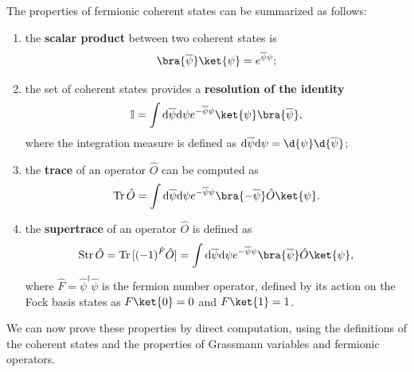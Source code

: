 The properties of fermionic coherent states can be summarized as follows:
\begin{enumerate}
    \item the \textbf{scalar product} between two coherent states is
          \[
              \bra{\overline{\psi}} \ket{\psi} = e^{\overline{\psi} \psi};
          \]
    \item the set of coherent states provides a \textbf{resolution of the identity}
          \[
              \mathbb{I} = \int \mathrm{d} \overline{\psi} \mathrm{d} \psi e^{-\overline{\psi} \psi} \ket{\psi} \bra{\overline{\psi}},
          \]
          where the integration measure is defined as \(\mathrm{d} \overline{\psi} \mathrm{d} \psi = \d{\psi} \d{\overline{\psi}}\);
    \item the \textbf{trace} of an operator \(\hat{O}\) can be computed as
          \[
              \text{Tr}\, \hat{O} = \int \mathrm{d} \overline{\psi} \mathrm{d} \psi e^{-\overline{\psi} \psi} \bra{-\overline{\psi}} \hat{O} \ket{\psi}.
          \]
    \item the \textbf{supertrace} of an operator \(\hat{O}\) is defined as
          \[
              \text{Str}\, \hat{O} = \text{Tr}\, [(-1)^{\hat{F}}  \hat{O}] = \int \mathrm{d} \overline{\psi} \mathrm{d} \psi e^{-\overline{\psi} \psi} \bra{\overline{\psi}} \hat{O} \ket{\psi},
          \]
          where \(\hat{F} = \hat{\psi}^\dagger \hat{\psi}\) is the fermion number operator, defined by its action on the Fock basis states as \(F \ket{0} = 0\) and \(F \ket{1} = 1\).
\end{enumerate}
We can now prove these properties by direct computation, using the definitions of the coherent states and the properties of Grassmann variables and fermionic operators.
